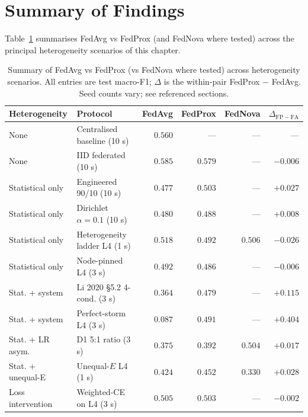 \documentclass[11pt,a4paper]{report}
\begin{document}
\section{Summary of Findings}
\label{sec:cond-summary}

Table~\ref{tab:cond-summary} summarises FedAvg vs FedProx (and FedNova
where tested) across the principal heterogeneity scenarios of this
chapter.

\begin{table}[!htbp]
\centering
\caption{Summary of FedAvg vs FedProx (vs FedNova where tested) across
heterogeneity scenarios. All entries are test macro-F1; $\Delta$ is the
within-pair FedProx $-$ FedAvg. Seed counts vary; see referenced sections.}
\label{tab:cond-summary}
\small
\begin{tabular}{llrrrr}
\toprule
Heterogeneity & Protocol  & FedAvg  & FedProx & FedNova & $\Delta_{\mathrm{FP-FA}}$ \\
\midrule
None               & Centralised baseline (10 s) & $0.560$ & ---     & ---     & ---       \\
None               & IID federated (10 s)        & $0.585$ & $0.579$ & ---     & $-0.006$  \\
Statistical only   & Engineered 90/10 (10 s)     & $0.477$ & $0.503$ & ---     & $+0.027$  \\
Statistical only   & Dirichlet $\alpha = 0.1$ (10 s) & $0.480$ & $0.488$ & ---     & $+0.008$  \\
Statistical only   & Heterogeneity ladder L4 (1 s) & $0.518$ & $0.492$ & $0.506$ & $-0.026$  \\
Statistical only   & Node-pinned L4 (3 s)        & $0.492$ & $0.486$ & ---     & $-0.006$  \\
Stat. + system     & Li 2020 §5.2 4-cond. (3 s)  & $0.364$ & $0.479$ & ---     & $+0.115$  \\
Stat. + system     & Perfect-storm L4 (3 s)      & $0.087$ & $0.491$ & ---     & $\mathbf{+0.404}$ \\
Stat. + LR asym.   & D1 5:1 ratio (3 s)          & $0.375$ & $0.392$ & $\mathbf{0.504}$ & $+0.017$ \\
Stat. + unequal-E  & Unequal-$E$ L4 (1 s)        & $0.424$ & $0.452$ & $0.330$ & $+0.028$ \\
Loss intervention  & Weighted-CE on L4 (3 s)     & $0.505$ & $0.503$ & ---     & $-0.002$  \\
\bottomrule
\end{tabular}
\end{table}
\end{document}
